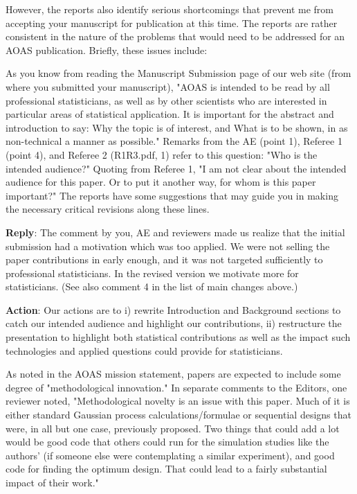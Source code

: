 \documentclass[a4paper]{article}
\newcounter{reviewer}
\def\reply{\textbf{Reply}}
\def\action{\textbf{Action}}
\begin{document}
However, the reports also identify serious shortcomings that 
prevent me from accepting your manuscript for publication at
this time. The reports are rather consistent in the nature of 
the problems that would need to be addressed for an AOAS publication.  
Briefly, these issues include:

\vspace{5mm}

As you know from reading the Manuscript Submission page of our
web site (from where you submitted your manuscript), "AOAS is 
intended to be read by all professional statisticians, as well 
as by other scientists who are interested in particular areas 
of statistical application. It is important for the abstract
and introduction to say: Why the topic is of interest, and What 
is to be shown, in as non-technical a manner as possible."
Remarks from the AE (point 1), Referee 1 (point 4), and Referee 2 
(R1R3.pdf, 1) refer to this question: "Who is the intended
audience?"  Quoting from Referee 1, "I am not clear about the 
intended audience for this paper.  Or to put it another way, 
for whom is this paper important?" The reports have some 
suggestions that may guide you in making the necessary critical 
revisions along these lines.  

\reply: The comment by you, AE and reviewers made us realize that the initial submission had a motivation which was too applied. We were not selling the paper contributions in early enough, and it was not targeted sufficiently to professional statisticians. In the revised version we motivate more for statisticians. (See also comment 4 in the list of main changes above.)

\action: Our actions are to i) rewrite Introduction and Background sections to catch our intended audience and highlight our contributions, ii) restructure the presentation to highlight both statistical contributions as well as the impact such technologies and applied questions could provide for statisticians. 

\vspace{5mm}

As noted in the AOAS mission statement, papers are expected
to include some degree of "methodological innovation."
In separate comments to the Editors, one reviewer noted,
"Methodological novelty is an issue with this paper.  Much of 
it is either standard Gaussian process calculations/formulae 
or sequential designs that were, in all but one case, previously 
proposed. Two things that could add a lot would be good code 
that others could run for the simulation studies like the authors' 
(if someone else were contemplating a similar experiment), and 
good code for finding the optimum design. That could lead to a 
fairly substantial impact of their work."
\end{document}
